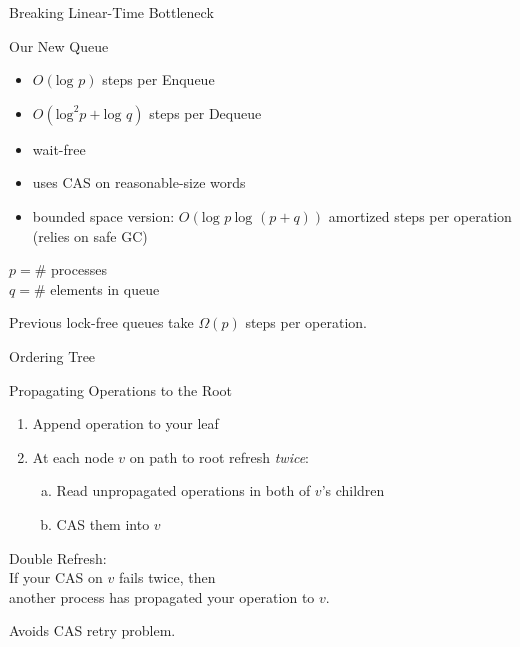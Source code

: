 \documentclass[compress]{beamer}
\newcommand{\Red}[1]{{\color{red}#1}}
\newcommand{\op}[1]{\mbox{\sc #1}}
\renewcommand{\log}{\mbox{log }} %
\begin{document}
\begin{frame}{Breaking Linear-Time Bottleneck}

\begin{block}{Our New Queue}
\begin{itemize}
\item $O(\log p)$ steps per \op{Enqueue}
\item $O(\mbox{log}^2 p + \log q)$ steps per \op{Dequeue}
\item wait-free
\item uses CAS on reasonable-size words
\item bounded space version: $O(\log p\ \log(p+q))$ amortized steps per operation
(relies on safe GC)
\end{itemize}
\end{block}

$p = \#$ processes\\
$q = \#$ elements in queue

\medskip

Previous lock-free queues take $\Omega(p)$ steps per operation.

\end{frame}

\begin{frame}{Ordering Tree}

\hspace*{-7mm}
\only<2>{}%
\only<3>{}%

\end{frame}

\begin{frame}{Propagating Operations to the Root}

\begin{enumerate}
\item
Append operation to your leaf
\item
At each node $v$ on path to root refresh {\it twice}:
\begin{enumerate}[(a)]
\item
Read unpropagated operations in both of $v$'s children
\item
CAS them into $v$
\end{enumerate}
\end{enumerate}

\pause
\medskip

\Red{Double Refresh}:\\
If your CAS on $v$ fails twice, then\\
another process has propagated your operation to $v$.

\pause
\medskip
Avoids CAS retry problem.
\end{frame}
\end{document}
